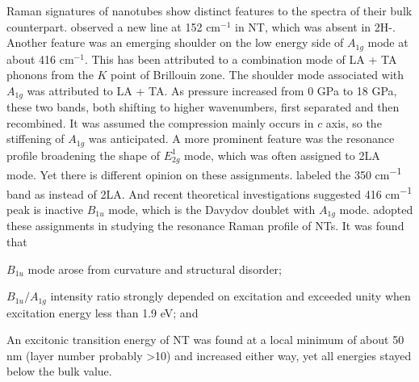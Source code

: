 Raman signatures of  nanotubes show distinct features to the spectra of their bulk counterpart. \citeauthor{JMR7990865} observed a new line at 152 cm$^{-1}$ in  NT, which was absent in 2H-.\cite{JMR7990865} Another feature was an emerging shoulder on the low energy side of $A_{1g}$ mode at about 416 cm$^{-1}$. This has been attributed to a combination mode of LA + TA phonons from the $K$ point of Brillouin zone.\cite{Sourisseau1991} The shoulder mode associated with $A_{1g}$ was attributed to LA + TA. As pressure increased from 0 GPa to 18 GPa, these two bands, both shifting to higher wavenumbers, first separated and then recombined. It was assumed the compression mainly occurs in $c$ axis, so the stiffening of $A_{1g}$ was anticipated. A more prominent feature was the resonance profile broadening the shape of $E_{2g}^1$ mode, which was often assigned to 2LA mode. Yet there is different opinion on these assignments. \citeauthor{Molina-Sanchez2011} labeled the 350 \si{cm^{-1}} band as  instead of 2LA.\cite{Molina-Sanchez2011} And recent theoretical investigations suggested 416 \si{cm^{-1}} peak is inactive $B_{1u}$ mode,\cite{Molina-Sanchez2011,Ataca2012} which is the Davydov doublet with $A_{1g}$ mode. \citeauthor{Staiger2012} adopted these assignments in studying the resonance Raman profile of  NTs.\cite{Staiger2012} It was found that
\begin{enumerate*}[label=\itshape\alph*\upshape)]
\item $B_{1u}$ mode arose from curvature and structural disorder;
\item $B_{1u}/A_{1g}$ intensity ratio strongly depended on excitation and exceeded unity when excitation energy less than 1.9 eV; and
\item  An excitonic transition energy of NT was found at a local minimum of about 50 nm (layer number probably \textgreater 10) and increased either way, yet all energies stayed below the bulk value.
\end{enumerate*}

